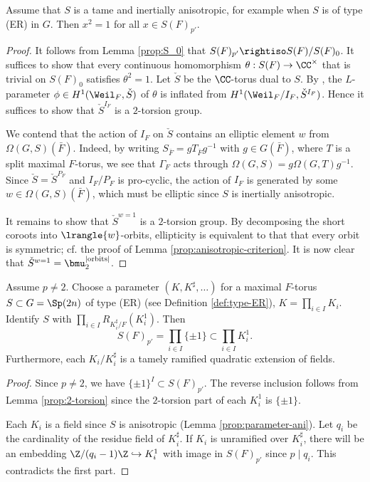 \documentclass[a4paper,10pt]{article}
\begin{document}
\begin{lemma}\label{prop:2-torsion}
	Assume that $S$ is a tame and inertially anisotropic, for example when $S$ is of type (ER) in $G$. Then $x^2=1$ for all $x \in S(F)_{p'}$.
\end{lemma}
\begin{proof}
	It follows from Lemma \ref{prop:S_0} that $S(F)_{p'} \rightiso S(F)/S(F)_0$. It suffices to show that every continuous homomorphism $\theta: S(F) \to \CC^\times$ that is trivial on $S(F)_0$ satisfies $\theta^2=1$. Let $\check{S}$ be the $\CC$-torus dual to $S$. By \cite[Lemma 3.1.5]{Kal16}, the $L$-parameter $\phi \in H^1(\Weil_F, \check{S})$ of $\theta$ is inflated from $H^1(\Weil_F/I_F, \check{S}^{I_F})$. Hence it suffices to show that $\check{S}^{I_F}$ is a $2$-torsion group.
	
	We contend that the action of $I_F$ on $\check{S}$ contains an elliptic element $w$ from $\Omega(G, S)(\bar{F})$. Indeed, by writing $S_{\bar{F}} = g T_{\bar{F}} g^{-1}$ with $g \in G(\bar{F})$, where $T$ is a split maximal $F$-torus, we see that $\Gamma_F$ acts through $\Omega(G, S) = g\Omega(G,T) g^{-1}$. Since $\check{S} = \check{S}^{P_F}$ and $I_F/P_F$ is pro-cyclic, the action of $I_F$ is generated by some $w \in \Omega(G, S)(\bar{F})$, which must be elliptic since $S$ is inertially anisotropic.
	
	It remains to show that $\check{S}^{w=1}$ is a $2$-torsion group. By decomposing the short coroots into $\lrangle{w}$-orbits, ellipticity is equivalent to that that every orbit is symmetric; cf. the proof of Lemma \ref{prop:anisotropic-criterion}. It is now clear that $\check{S}^{w=1} = \bmu_2^{|\text{orbits}|}$.
\end{proof}

\begin{theorem}\label{prop:S-p'}
	Assume $p \neq 2$. Choose a parameter $(K, K^\sharp, \ldots)$ for a maximal $F$-torus $S \subset G=\Sp(2n)$ of type (ER) (see Definition \ref{def:type-ER}), $K = \prod_{i\in I} K_i$. Identify $S$ with $\prod_{i \in I} R_{K_i^\sharp /F}(K_i^1)$. Then
	\[ S(F)_{p'} = \prod_{i \in I} \{\pm 1\} \subset \prod_{i \in I} K_i^1. \]
	Furthermore, each $K_i/K_i^\sharp$ is a tamely ramified quadratic extension of fields.
\end{theorem}
\begin{proof}
	Since $p \neq 2$, we have $\{\pm 1\}^I \subset S(F)_{p'}$. The reverse inclusion follows from Lemma \ref{prop:2-torsion} since the $2$-torsion part of each $K_i^1$ is $\{\pm 1\}$.
	
	Each $K_i$ is a field since $S$ is anisotropic (Lemma \ref{prop:parameter-ani}). Let $q_i$ be the cardinality of the residue field of $K_i^\sharp$. If $K_i$ is unramified over $K_i^\sharp$, there will be an embedding $\Z/(q_i - 1)\Z \hookrightarrow K_i^1$ with image in $S(F)_{p'}$ since $p \mid q_i$. This contradicts the first part.
\end{proof}
\end{document}
